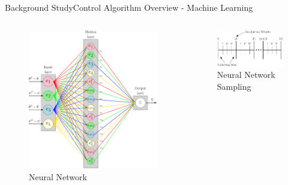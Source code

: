 \documentclass{beamer}
\begin{document}
\begin{frame}{Background Study}{Control Algorithm Overview - Machine Learning}
    \begin{columns}
    \begin{figure}
        \centering
        \includegraphics[width=\textwidth]{figs/ipe/ADP_Neural_Network}
        \caption{Neural Network}
        \label{fig:ADP_Neural_Networkl}
    \end{figure}
    \begin{figure}
      \centering 
      \includegraphics[width=\textwidth]{figs/ipe/ADP_Samples}
      \caption{Neural Network Sampling}
      \label{fig:ADP_Samples}
    \end{figure}    
    \end{columns}
\end{frame}
\end{document}
